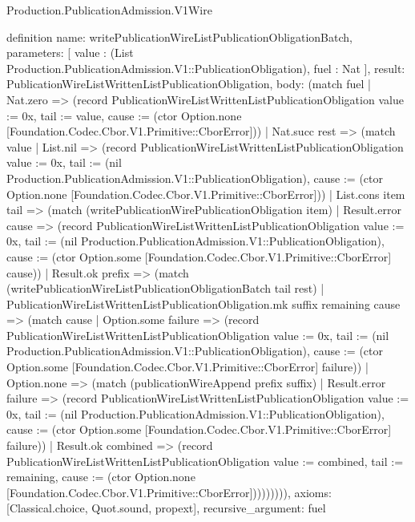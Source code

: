 \begin{lexlean}{Production.PublicationAdmission.V1Wire}
\begin{semanticmodule}
definition{
  name: writePublicationWireListPublicationObligationBatch,
  parameters: [
    value : (List Production.PublicationAdmission.V1::PublicationObligation),
    fuel : Nat
  ],
  result: PublicationWireListWrittenListPublicationObligation,
  body: (match fuel
    | Nat.zero => (record PublicationWireListWrittenListPublicationObligation {value := 0x, tail := value, cause := (ctor Option.none [Foundation.Codec.Cbor.V1.Primitive::CborError])})
    | Nat.succ rest => (match value
      | List.nil => (record PublicationWireListWrittenListPublicationObligation {value := 0x, tail := (nil Production.PublicationAdmission.V1::PublicationObligation), cause := (ctor Option.none [Foundation.Codec.Cbor.V1.Primitive::CborError])})
      | List.cons item tail => (match (writePublicationWirePublicationObligation item)
        | Result.error cause => (record PublicationWireListWrittenListPublicationObligation {value := 0x, tail := (nil Production.PublicationAdmission.V1::PublicationObligation), cause := (ctor Option.some [Foundation.Codec.Cbor.V1.Primitive::CborError] cause)})
        | Result.ok prefix => (match (writePublicationWireListPublicationObligationBatch tail rest)
          | PublicationWireListWrittenListPublicationObligation.mk suffix remaining cause => (match cause
            | Option.some failure => (record PublicationWireListWrittenListPublicationObligation {value := 0x, tail := (nil Production.PublicationAdmission.V1::PublicationObligation), cause := (ctor Option.some [Foundation.Codec.Cbor.V1.Primitive::CborError] failure)})
            | Option.none => (match (publicationWireAppend prefix suffix)
              | Result.error failure => (record PublicationWireListWrittenListPublicationObligation {value := 0x, tail := (nil Production.PublicationAdmission.V1::PublicationObligation), cause := (ctor Option.some [Foundation.Codec.Cbor.V1.Primitive::CborError] failure)})
              | Result.ok combined => (record PublicationWireListWrittenListPublicationObligation {value := combined, tail := remaining, cause := (ctor Option.none [Foundation.Codec.Cbor.V1.Primitive::CborError])}))))))),
  axioms: [Classical.choice, Quot.sound, propext],
  recursive_argument: fuel
}


\end{semanticmodule}
\end{lexlean}
